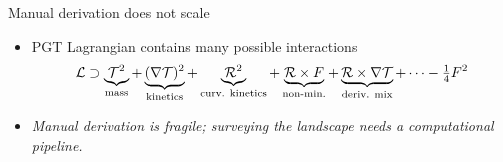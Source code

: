 \begin{frame}{Manual derivation does not scale}
  \begin{itemize}
    \item PGT Lagrangian contains many possible interactions
    \[
      \mathcal{L} \supset
        \underbrace{\mathcal{T}^2}_{\text{mass}}
        + \underbrace{(\nabla \mathcal{T})^2}_{\text{kinetics}}
        + \underbrace{\mathcal{R}^2}_{\text{curv. kinetics}}
        + \underbrace{\mathcal{R}\times F}_{\text{non-min.}}
        + \underbrace{\mathcal{R}\times\nabla \mathcal{T}}_{\text{deriv. mix}}
        + \cdots
        - \tfrac{1}{4}F^2
    \]
    \item \emph{Manual derivation is fragile; surveying the landscape needs a computational pipeline.}
  \end{itemize}
\end{frame}
